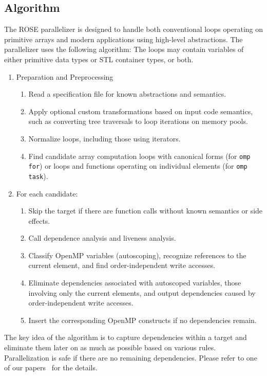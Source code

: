 \subsection{Algorithm}
The ROSE parallelizer is designed to handle both conventional loops operating on primitive
arrays and modern applications using high-level abstractions.
The parallelizer uses the following algorithm:
The loops may contain variables of either primitive data types
or STL container types, or both. 
\begin{enumerate}
  \item Preparation and Preprocessing
  \begin{enumerate}
  \item  Read a specification file for known abstractions and semantics. %
  \item  Apply optional custom transformations based on input code semantics,
  such as converting tree traversals to loop iterations on memory
  pools.
  \item  Normalize loops, including those using iterators.
  \item  Find candidate array computation loops
  with canonical forms (for \lstinline{omp for}) or loops and functions
  operating on individual elements (for \lstinline{omp task}).
  \end{enumerate}
  \item  For each candidate:
  \begin{enumerate}
    \item Skip the target if there are function calls without known semantics or side effects. %
    \item Call dependence analysis and liveness analysis.
    \item Classify OpenMP variables (autoscoping), recognize references
    to the current element, and find order-independent write accesses.
    \item Eliminate dependencies associated with autoscoped variables,
    those involving only the current elements, and output dependencies
    caused by order-independent write accesses.
    \item Insert the corresponding OpenMP constructs if no dependencies
    remain.
  \end{enumerate}
\end{enumerate}
The key idea of the algorithm is to capture dependencies within a target and eliminate them later on as much as possible based on
various rules.
Parallelization is safe if there are no remaining dependencies.
Please refer to one of our papers~\cite{LiaoExtending2009} for the details. 
